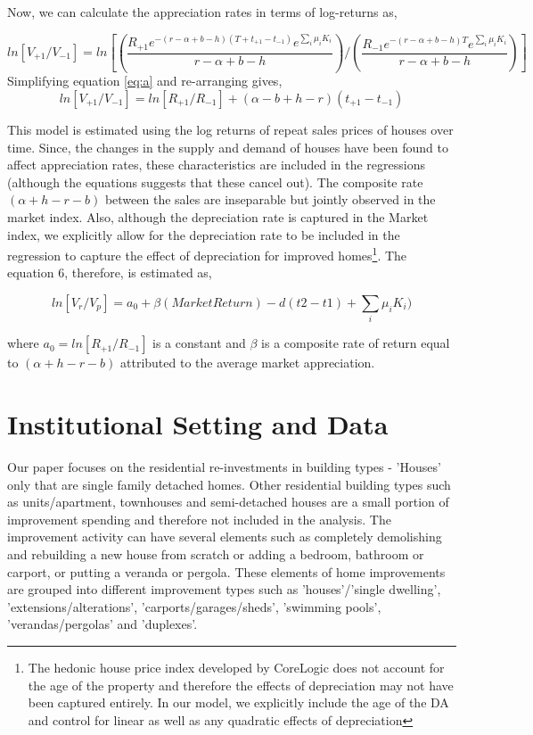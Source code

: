 \documentclass{article}
\begin{document}
Now, we can calculate the appreciation rates in terms of log-returns as,

\begin{equation} \label{eq:a}
    ln [V_{+1}/V_{-1}] = ln [ (\frac{R_{+1} e^{-(r-\alpha+b-h)(T+t_{+1}-t_{-1})} e^{\sum_{i} \mu_i K_i}}{r-\alpha+b-h}) / (\frac{R_{-1} e^{-(r-\alpha+b-h)T} e^{\sum_{i} \mu_i K_i}}{r-\alpha+b-h})]
\end{equation}
Simplifying equation \ref{eq:a} and re-arranging gives,
\begin{equation}
    ln [V_{+1}/V_{-1}] = ln [R_{+1}/R_{-1}] + (\alpha-b+h-r)(t_{+1}-t_{-1}) 
\end{equation}

This model is estimated using the log returns of repeat sales prices of houses over time. Since, the changes in the supply and demand of houses have been found to affect appreciation rates, these characteristics are included in the regressions (although the equations suggests that these cancel out). The composite rate $(\alpha+h-r-b)$ between the sales are inseparable but jointly observed in the market index. Also, although the depreciation rate is captured in the Market index, we explicitly allow for the depreciation rate to be included in the regression to capture the effect of depreciation for improved homes\footnote{The hedonic house price index developed by CoreLogic does not account for the age of the property and therefore the effects of depreciation may not have been captured entirely. In our model, we explicitly include the age of the DA and control for linear as well as any quadratic effects of depreciation}. The equation 6, therefore, is estimated as,

\begin{equation} \label{eq:estimate}
    ln [V_{r}/V_{p}] = a_0 + \beta{(Market Return)} - d(t2-t1) + \sum_{i}\mu_i K_i )
\end{equation}

where $a_0 = ln [R_{+1}/R_{-1}]$ is a constant and $\beta$ is a composite rate of return equal to $(\alpha+h-r-b)$ attributed to the average market appreciation.


\section{Institutional Setting and Data}

Our paper focuses on the residential re-investments in building types - 'Houses' only that are single family detached homes. Other residential building types such as units/apartment, townhouses and semi-detached houses are a small portion of improvement spending and therefore not included in the analysis. The improvement activity can have several elements such as completely demolishing and rebuilding a new house from scratch or adding a bedroom, bathroom or carport, or putting a veranda or pergola. These elements of home improvements are grouped into different improvement types such as 'houses'/'single dwelling', 'extensions/alterations', 'carports/garages/sheds', 'swimming pools', 'verandas/pergolas' and 'duplexes'.
\end{document}

